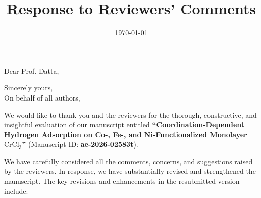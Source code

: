 \documentclass[11pt, sans, a4paper]{moderncv}
\title{Response to Reviewers' Comments}
\begin{document}
\date{\today}
\opening{Dear Prof. Datta,}
\closing{Sincerely yours,\\On behalf of all authors,}

\makelettertitle

\justify

We would like to thank you and the reviewers for the thorough, constructive, and insightful evaluation of our manuscript entitled \textbf{``Coordination-Dependent Hydrogen Adsorption on Co-, Fe-, and Ni-Functionalized Monolayer $\text{CrCl}_3$''} (Manuscript ID: \textbf{ae-2026-02583t}).

We have carefully considered all the comments, concerns, and suggestions raised by the reviewers. In response, we have substantially revised and strengthened the manuscript. The key revisions and enhancements in the resubmitted version include:
\end{document}
